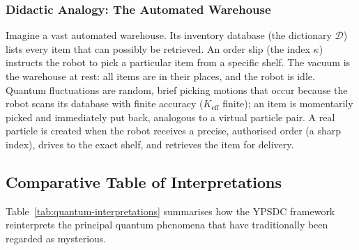 \documentclass[12pt,a4paper]{article}
\theoremstyle{remark}
\begin{document}
	\subsubsection{Didactic Analogy: The Automated Warehouse}
	
	Imagine a vast automated warehouse.  Its inventory database
	(the dictionary $\mathcal{D}$) lists every item that can possibly
	be retrieved.  An order slip (the index $\kappa$) instructs the
	robot to pick a particular item from a specific shelf.  The
	vacuum is the warehouse at rest: all items are in their places,
	and the robot is idle.  Quantum fluctuations are random, brief
	picking motions that occur because the robot scans its database
	with finite accuracy ($K_{\mathrm{eff}}$ finite); an item is
	momentarily picked and immediately put back, analogous to a
	virtual particle pair.  A real particle is created when the robot
	receives a precise, authorised order (a sharp index), drives to
	the exact shelf, and retrieves the item for delivery.
	
	\medskip
	
	\subsection{Comparative Table of Interpretations}
	
	Table~\ref{tab:quantum-interpretations} summarises how the YPSDC
	framework reinterprets the principal quantum phenomena that have
	traditionally been regarded as mysterious.
	
\end{document}
